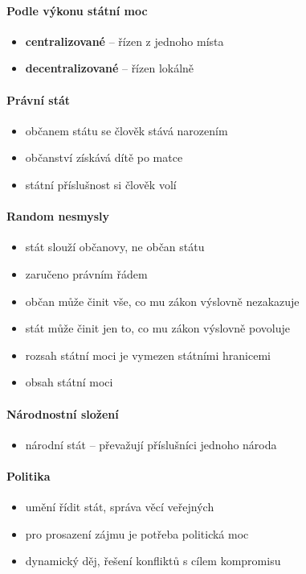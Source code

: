 \paragraph{Podle výkonu státní moc}
\begin{itemize}
\item \textbf{centralizované} -- řízen z jednoho místa
\item \textbf{decentralizované} -- řízen lokálně
\end{itemize}

\paragraph{Právní stát}
\begin{itemize}
\item občanem státu se člověk stává narozením
\item občanství získává dítě po matce
\item státní příslušnost si člověk volí
\end{itemize}

\paragraph{Random nesmysly}
\begin{itemize}
\item stát slouží občanovy, ne občan státu	
\item zaručeno právním řádem
\item občan může činit vše, co mu zákon výslovně nezakazuje
\item stát může činit jen to, co mu zákon výslovně povoluje
\item rozsah státní moci je vymezen státními hranicemi
\item obsah státní moci 
\end{itemize}

\paragraph{Národnostní složení}
\begin{itemize}
\item národní stát -- převažují příslušníci jednoho národa
\end{itemize}


\paragraph{Politika}
\begin{itemize}
\item umění řídit stát, správa věcí veřejných
\item pro prosazení zájmu je potřeba politická moc
\item dynamický děj, řešení konfliktů s cílem kompromisu
\end{itemize}

